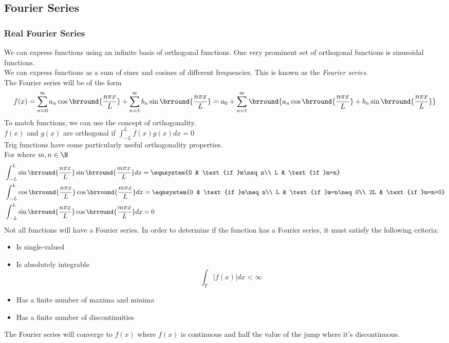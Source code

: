 \subsection{Fourier Series}
\subsubsection{Real Fourier Series}
We can express functions using an infinite basis of orthogonal functions. One very prominent set of orthogonal functions is sinusoidal functions.\\
We can express functions as a sum of sines and cosines of different frequencies. This is known as the \textit{Fourier series}.\\
The Fourier series will be of the form
$$f(x)=\sum_{n=0}^\infty a_n\cos\brround{\frac{n\pi x}{L}}+\sum_{n=1}^\infty b_n\sin\brround{\frac{n\pi x}{L}}=a_0+\sum_{n=1}^\infty\brround{a_n\cos\brround{\frac{n\pi x}{L}}+b_n\sin\brround{\frac{n\pi x}{L}}}$$
To match functions, we can use the concept of orthogonality.\\
$f(x)$ and $g(x)$ are orthogonal if $\displaystyle{\int_{-L}^Lf(x)g(x)dx=0}$\\
Trig functions have some particularly useful orthogonality properties.\\
For where $m,n\in\N$
\begin{align*}
    &\int_{-L}^L\sin\brround{\frac{n\pi x}{L}}\sin\brround{\frac{m\pi x}{L}}dx=\eqnsystem{0 & \text{if }m\neq n\\ L & \text{if }m=n}\\
    &\int_{-L}^L\cos\brround{\frac{n\pi x}{L}}\cos\brround{\frac{m\pi x}{L}}dx=\eqnsystem{0 & \text{if }m\neq n\\ L & \text{if }m=n\neq 0\\ 2L & \text{if }m=n=0}\\
    &\int_{-L}^L\sin\brround{\frac{n\pi x}{L}}\cos\brround{\frac{m\pi x}{L}}dx=0
\end{align*}
Not all functions will have a Fourier series. In order to determine if the function has a Fourier series, it must satisfy the following criteria:
\begin{itemize}
    \item Is single-valued
    \item Is absolutely integrable
    \[ \int_T|f(x)|dx<\infty \]
    \item Has a finite number of maxima and minima
    \item Has a finite number of discontinuities
\end{itemize}
The Fourier series will converge to $f(x)$ where $f(x)$ is continuous and half the value of the jump where it's discontinuous.\\

